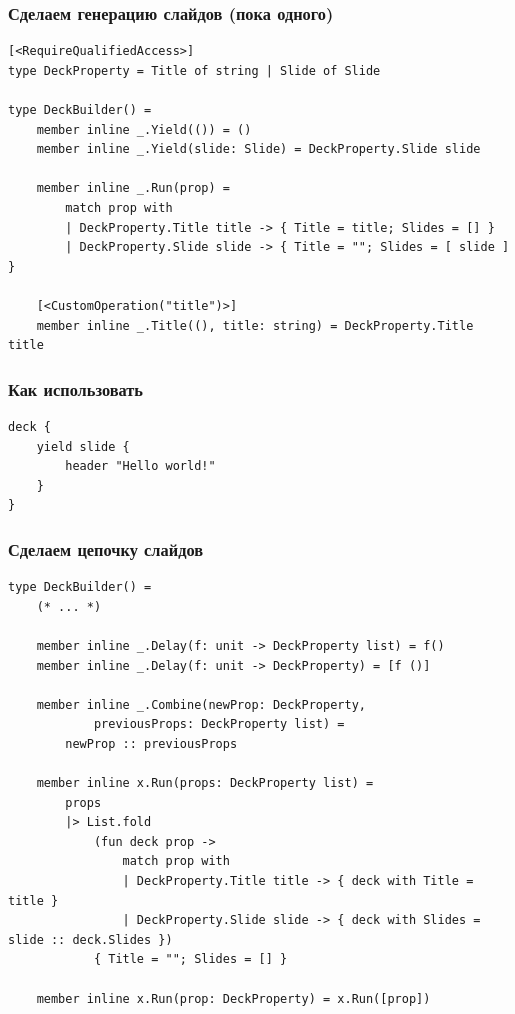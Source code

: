 \documentclass{../../slides-style}
\begin{document}
    \begin{frame}[fragile]
        \frametitle{Сделаем генерацию слайдов (пока одного)}
        \begin{verbatim}
[<RequireQualifiedAccess>]
type DeckProperty = Title of string | Slide of Slide

type DeckBuilder() =
    member inline _.Yield(()) = ()
    member inline _.Yield(slide: Slide) = DeckProperty.Slide slide

    member inline _.Run(prop) =
        match prop with
        | DeckProperty.Title title -> { Title = title; Slides = [] }
        | DeckProperty.Slide slide -> { Title = ""; Slides = [ slide ] }

    [<CustomOperation("title")>]
    member inline _.Title((), title: string) = DeckProperty.Title title
        \end{verbatim}
    \end{frame}

    \begin{frame}[fragile]
        \frametitle{Как использовать}
        \begin{verbatim}
deck {
    yield slide {
        header "Hello world!"
    }
}
        \end{verbatim}
    \end{frame}

    \begin{frame}[fragile]
        \frametitle{Сделаем цепочку слайдов}
        \begin{footnotesize}
            \begin{verbatim}
type DeckBuilder() =
    (* ... *)

    member inline _.Delay(f: unit -> DeckProperty list) = f()
    member inline _.Delay(f: unit -> DeckProperty) = [f ()]

    member inline _.Combine(newProp: DeckProperty, 
            previousProps: DeckProperty list) =
        newProp :: previousProps

    member inline x.Run(props: DeckProperty list) =
        props
        |> List.fold
            (fun deck prop ->
                match prop with
                | DeckProperty.Title title -> { deck with Title = title }
                | DeckProperty.Slide slide -> { deck with Slides = slide :: deck.Slides })
            { Title = ""; Slides = [] }

    member inline x.Run(prop: DeckProperty) = x.Run([prop])
            \end{verbatim}
        \end{footnotesize}
    \end{frame}
\end{document}
